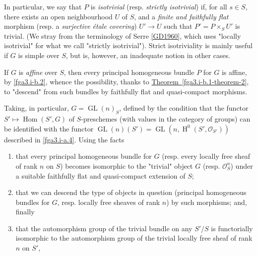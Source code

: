   In particular, we say that \(P\) is \emph{isotrivial} (resp. \emph{strictly isotrivial}) if, for all \(s\in  S\), there exists an open neighbourhood \(U\) of \(S\), and a \emph{finite and faithfully flat} morphism (resp. a \emph{surjective étale covering}) \(U'\to  U\) such that \(P'=P\times _S U'\) is trivial.
  (We stray from the terminology of Serre \hyperref[GD1960]{[GD1960]}, which uses "locally isotrivial" for what we call "strictly isotrivial").
  Strict isotriviality is mainly useful if \(G\) is simple over \(S\), but is, however, an inadequate notion in other cases.\par{}If \(G\) is \emph{affine} over \(S\), then every principal homogeneous bundle \(P\) for \(G\) is affine, by \cref{fga3.i-b.2}, whence the possibility, thanks to \hyperref[fga3.i-b.1-theorem-2]{Theorem~\ref*{fga3.i-b.1-theorem-2}}, to "descend" from such bundles by faithfully flat and quasi-compact morphisms.
  
  Taking, in particular, \(G=\operatorname {GL}(n)_S\), defined by the condition that the functor \(S'\mapsto \operatorname {Hom}(S',G)\) of \(S\)-preschemes (with values in the category of groups) can be identified with the functor \(\operatorname {GL}(n)(S')=\operatorname {GL}(n,\operatorname {H}^0(S',\mathscr {O}_{S'}))\) described in \cref{fga3.i-a.4}.
  Using the facts

  
 \begin{enumerate}
    
 \item[i.]
      that every principal homogeneous bundle for \(G\) (resp. every locally free sheaf of rank \(n\) on \(S\)) becomes isomorphic to the "trivial" object \(G\) (resp. \(\mathscr {O}_S^n\)) under a suitable faithfully flat and quasi-compact extension of \(S\);
    


    
 \item[ii.]
      that we can descend the type of objects in question (principal homogeneous bundles for \(G\), resp. locally free sheaves of rank \(n\)) by such morphisms; and, finally
    


    
 \item[iii.]
      that the automorphism group of the trivial bundle on any \(S'/S\) is functorially isomorphic to the automorphism group of the trivial locally free sheaf of rank \(n\) on \(S'\),
    

  \end{enumerate}


